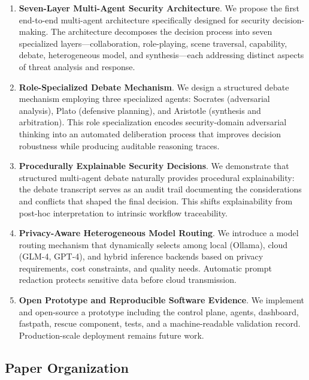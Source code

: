 \begin{enumerate}
    \item \textbf{Seven-Layer Multi-Agent Security Architecture}. We propose the first end-to-end multi-agent architecture specifically designed for security decision-making. The architecture decomposes the decision process into seven specialized layers---collaboration, role-playing, scene traversal, capability, debate, heterogeneous model, and synthesis---each addressing distinct aspects of threat analysis and response.

    \item \textbf{Role-Specialized Debate Mechanism}. We design a structured debate mechanism employing three specialized agents: Socrates (adversarial analysis), Plato (defensive planning), and Aristotle (synthesis and arbitration). This role specialization encodes security-domain adversarial thinking into an automated deliberation process that improves decision robustness while producing auditable reasoning traces.

    \item \textbf{Procedurally Explainable Security Decisions}. We demonstrate that structured multi-agent debate naturally provides procedural explainability: the debate transcript serves as an audit trail documenting the considerations and conflicts that shaped the final decision. This shifts explainability from post-hoc interpretation to intrinsic workflow traceability.

    \item \textbf{Privacy-Aware Heterogeneous Model Routing}. We introduce a model routing mechanism that dynamically selects among local (Ollama), cloud (GLM-4, GPT-4), and hybrid inference backends based on privacy requirements, cost constraints, and quality needs. Automatic prompt redaction protects sensitive data before cloud transmission.

    \item \textbf{Open Prototype and Reproducible Software Evidence}. We implement and open-source a prototype including the control plane, agents, dashboard, fastpath, rescue component, tests, and a machine-readable validation record. Production-scale deployment remains future work.
\end{enumerate}

\subsection{Paper Organization}
\label{subsec:organization}

